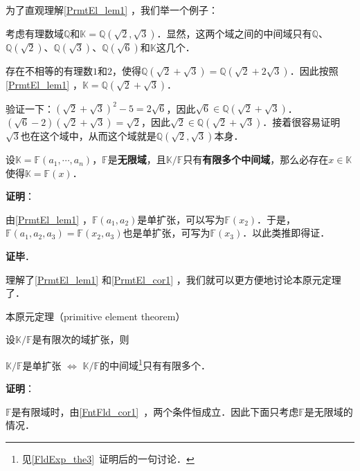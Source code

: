 为了直观理解\autoref{PrmtEl_lem1} ，我们举一个例子：

\begin{example}{}

考虑有理数域$\mathbb{Q}$和$\mathbb{K}=\mathbb{Q}(\sqrt{2}, \sqrt{3})$．显然，这两个域之间的中间域只有$\mathbb{Q}$、$\mathbb{Q}(\sqrt{2})$、$\mathbb{Q}(\sqrt{3})$、$\mathbb{Q}(\sqrt{6})$和$\mathbb{K}$这几个．

存在不相等的有理数$1$和$2$，使得$\mathbb{Q}(\sqrt{2}+\sqrt{3})=\mathbb{Q}(\sqrt{2}+2\sqrt{3})$．因此按照\autoref{PrmtEl_lem1} ，$\mathbb{K}=\mathbb{Q}(\sqrt{2}+\sqrt{3})$．

验证一下：$(\sqrt{2}+\sqrt{3})^2-5=2\sqrt{6}$，因此$\sqrt{6}\in\mathbb{Q}(\sqrt{2}+\sqrt{3})$．$(\sqrt{6}-2)(\sqrt{2}+\sqrt{3})=\sqrt{2}$，因此$\sqrt{2}\in\mathbb{Q}(\sqrt{2}+\sqrt{3})$．接着很容易证明$\sqrt{3}$也在这个域中，从而这个域就是$\mathbb{Q}(\sqrt{2}, \sqrt{3})$本身．

\end{example}


\begin{corollary}{}\label{PrmtEl_cor1}
设$\mathbb{K}=\mathbb{F}(a_1, \cdots, a_n)$，$\mathbb{F}$是\textbf{无限域}，且$\mathbb{K}/\mathbb{F}$只有\textbf{有限多个中间域}，那么必存在$x\in\mathbb{K}$使得$\mathbb{K}=\mathbb{F}(x)$．
\end{corollary}

\textbf{证明}：

由\autoref{PrmtEl_lem1} ，$\mathbb{F}(a_1, a_2)$是单扩张，可以写为$\mathbb{F}(x_2)$．于是，$\mathbb{F}(a_1, a_2, a_3)=\mathbb{F}(x_2, a_3)$也是单扩张，可写为$\mathbb{F}(x_3)$．以此类推即得证．

\textbf{证毕}．


理解了\autoref{PrmtEl_lem1} 和\autoref{PrmtEl_cor1} ，我们就可以更方便地讨论本原元定理了．


\begin{theorem}{本原元定理（primitive element theorem）}\label{PrmtEl_the1}

设$\mathbb{K}/\mathbb{F}$是有限次的域扩张，则

$\mathbb{K}/\mathbb{F}$是单扩张 $\iff$ $\mathbb{K}/\mathbb{F}$的中间域\footnote{见\autoref{FldExp_the3}~证明后的一句讨论．}只有有限多个．

\end{theorem}

\textbf{证明}：

$\mathbb{F}$是有限域时，由\autoref{FntFld_cor1}~，两个条件恒成立．因此下面只考虑$\mathbb{F}$是无限域的情况．

